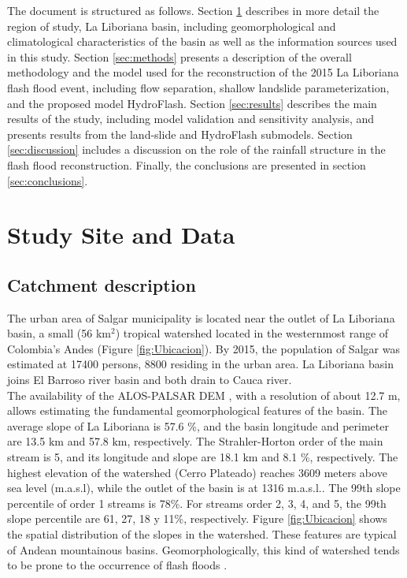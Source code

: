 \documentclass[hess, manuscript]{copernicus}
\begin{document}
The document is structured as follows. Section \ref{sec:data} describes in more detail the region of study, La Liboriana basin, including geomorphological and climatological characteristics of the basin as well as the information sources used in this study. Section \ref{sec:methods} presents a description of the overall methodology and the model used for the reconstruction of the 2015 La Liboriana flash flood event, including flow separation, shallow landslide parameterization, and the proposed model HydroFlash. Section \ref{sec:results} describes the main results of the study, including model validation and sensitivity analysis, and presents results from the land-slide and HydroFlash submodels. Section \ref{sec:discussion} includes a discussion on the role of the rainfall structure in the flash flood reconstruction.  Finally,  the conclusions are presented in section \ref{sec:conclusions}.

\section{Study Site and Data}
\label{sec:data}

\subsection{Catchment description}

The urban area of Salgar municipality is located near the outlet of La Liboriana basin, a small (56 km$^2$) tropical watershed located in the westernmost range of Colombia's Andes (Figure \ref{fig:Ubicacion}).  By 2015, the population of Salgar was estimated at 17400 persons, 8800 residing in the urban area.  La Liboriana basin joins El Barroso river basin and both drain to Cauca river. \\

The availability of the ALOS-PALSAR DEM \citep{ALOS}, with a resolution of about 12.7 m, allows estimating the fundamental geomorphological features of the basin.  The average slope of La Liboriana is  57.6 \%, and the basin longitude and perimeter are 13.5 $\text{km}$ and 57.8 $\text{km}$, respectively.  The Strahler-Horton order of the main stream is 5, and its longitude and slope are 18.1 $\text{km}$ and 8.1 \%, respectively. The highest elevation of the watershed (Cerro Plateado) reaches 3609 meters above sea level (m.a.s.l), while the outlet of the basin is at 1316 m.a.s.l..  The 99th slope percentile of order 1 streams is 78\%. For streams order 2, 3, 4, and 5, the 99th slope percentile are 61, 27, 18 y 11\%, respectively. Figure \ref{fig:Ubicacion} shows the spatial distribution of the slopes in the watershed. These features are typical of Andean mountainous basins.  Geomorphologically, this kind of watershed tends to be prone to the occurrence of flash floods \citep{Lehmann2012, Penna2011, Martin2018,Longoni2016, Ozturk2018, Khosravi2018, Marchi2016, Bisht2018}.\\
\end{document}
